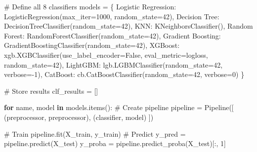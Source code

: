 \documentclass[
  letterpaper,
  DIV=11,
  numbers=noendperiod]{scrreprt}
\newenvironment{Shaded}{\begin{snugshade}}{\end{snugshade}}
\newcommand{\CommentTok}[1]{\textcolor[rgb]{0.37,0.37,0.37}{#1}}
\newcommand{\ControlFlowTok}[1]{\textcolor[rgb]{0.00,0.23,0.31}{\textbf{#1}}}
\newcommand{\DecValTok}[1]{\textcolor[rgb]{0.68,0.00,0.00}{#1}}
\newcommand{\KeywordTok}[1]{\textcolor[rgb]{0.00,0.23,0.31}{\textbf{#1}}}
\newcommand{\NormalTok}[1]{\textcolor[rgb]{0.00,0.23,0.31}{#1}}
\newcommand{\OperatorTok}[1]{\textcolor[rgb]{0.37,0.37,0.37}{#1}}
\newcommand{\StringTok}[1]{\textcolor[rgb]{0.13,0.47,0.30}{#1}}
\newcommand{\VariableTok}[1]{\textcolor[rgb]{0.07,0.07,0.07}{#1}}
\begin{document}
\begin{Shaded}
\begin{Highlighting}[]
\CommentTok{\# Define all 8 classifiers}
\NormalTok{models }\OperatorTok{=}\NormalTok{ \{}
    \StringTok{\textquotesingle{}Logistic Regression\textquotesingle{}}\NormalTok{: LogisticRegression(max\_iter}\OperatorTok{=}\DecValTok{1000}\NormalTok{, random\_state}\OperatorTok{=}\DecValTok{42}\NormalTok{),}
    \StringTok{\textquotesingle{}Decision Tree\textquotesingle{}}\NormalTok{: DecisionTreeClassifier(random\_state}\OperatorTok{=}\DecValTok{42}\NormalTok{),}
    \StringTok{\textquotesingle{}KNN\textquotesingle{}}\NormalTok{: KNeighborsClassifier(),}
    \StringTok{\textquotesingle{}Random Forest\textquotesingle{}}\NormalTok{: RandomForestClassifier(random\_state}\OperatorTok{=}\DecValTok{42}\NormalTok{),}
    \StringTok{\textquotesingle{}Gradient Boosting\textquotesingle{}}\NormalTok{: GradientBoostingClassifier(random\_state}\OperatorTok{=}\DecValTok{42}\NormalTok{),}
    \StringTok{\textquotesingle{}XGBoost\textquotesingle{}}\NormalTok{: xgb.XGBClassifier(use\_label\_encoder}\OperatorTok{=}\VariableTok{False}\NormalTok{, eval\_metric}\OperatorTok{=}\StringTok{\textquotesingle{}logloss\textquotesingle{}}\NormalTok{, random\_state}\OperatorTok{=}\DecValTok{42}\NormalTok{),}
    \StringTok{\textquotesingle{}LightGBM\textquotesingle{}}\NormalTok{: lgb.LGBMClassifier(random\_state}\OperatorTok{=}\DecValTok{42}\NormalTok{, verbose}\OperatorTok{={-}}\DecValTok{1}\NormalTok{),}
    \StringTok{\textquotesingle{}CatBoost\textquotesingle{}}\NormalTok{: cb.CatBoostClassifier(random\_state}\OperatorTok{=}\DecValTok{42}\NormalTok{, verbose}\OperatorTok{=}\DecValTok{0}\NormalTok{)}
\NormalTok{\}}

\CommentTok{\# Store results}
\NormalTok{clf\_results }\OperatorTok{=}\NormalTok{ []}

\ControlFlowTok{for}\NormalTok{ name, model }\KeywordTok{in}\NormalTok{ models.items():}
    \CommentTok{\# Create pipeline}
\NormalTok{    pipeline }\OperatorTok{=}\NormalTok{ Pipeline([}
\NormalTok{        (}\StringTok{\textquotesingle{}preprocessor\textquotesingle{}}\NormalTok{, preprocessor),}
\NormalTok{        (}\StringTok{\textquotesingle{}classifier\textquotesingle{}}\NormalTok{, model)}
\NormalTok{    ])}
    
    \CommentTok{\# Train}
\NormalTok{    pipeline.fit(X\_train, y\_train)}
        \CommentTok{\# Predict}
\NormalTok{    y\_pred }\OperatorTok{=}\NormalTok{ pipeline.predict(X\_test)}
\NormalTok{    y\_proba }\OperatorTok{=}\NormalTok{ pipeline.predict\_proba(X\_test)[:, }\DecValTok{1}\NormalTok{]}
    

\end{Highlighting}
\end{Shaded}
\end{document}
